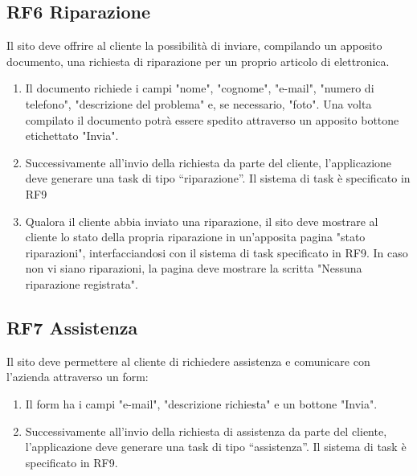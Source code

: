 \documentclass{report}
\begin{document}
\subsection*{RF6 Riparazione}

Il sito deve offrire al cliente la possibilità di inviare, compilando un apposito documento, una richiesta di riparazione per un proprio articolo di elettronica.
\begin{enumerate}


	\item Il documento richiede i campi "nome", "cognome", "e-mail", "numero di telefono", "descrizione del problema" e, se necessario, "foto". Una volta compilato il documento potrà essere spedito attraverso un apposito bottone etichettato "Invia".
	
	\item Successivamente all’invio della richiesta da parte del cliente, l’applicazione deve generare una task di tipo “riparazione”. Il sistema di task è specificato in RF9
	
	\item Qualora il cliente abbia inviato una riparazione, il sito deve mostrare al cliente lo stato della propria riparazione in un'apposita pagina "stato riparazioni", interfacciandosi con il sistema di task specificato in RF9. In caso non vi siano riparazioni, la pagina deve mostrare la scritta "Nessuna riparazione registrata".
	
\end{enumerate}

\subsection*{RF7 Assistenza}
Il sito deve permettere al cliente di richiedere assistenza e comunicare con l'azienda attraverso un form:

\begin{enumerate}
	\item Il form ha i campi "e-mail", "descrizione richiesta" e un bottone "Invia".
	
	\item Successivamente all’invio della richiesta di assistenza da parte del cliente, l’applicazione deve generare una task di tipo “assistenza”. Il sistema di task è specificato in RF9.
	
	
\end{enumerate}
\end{document}
